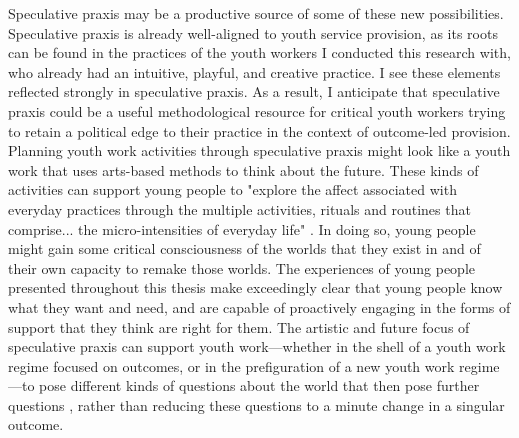 Speculative praxis may be a productive source of some of these new possibilities. Speculative praxis is already well-aligned to youth service provision, as its roots can be found in the practices of the youth workers I conducted this research with, who already had an intuitive, playful, and creative practice. I see these elements reflected strongly in speculative praxis. As a result, I anticipate that speculative praxis could be a useful methodological resource for critical youth workers trying to retain a political edge to their practice in the context of outcome-led provision. Planning youth work activities through speculative praxis might look like a youth work that uses arts-based methods to think about the future. These kinds of activities can support young people to "explore the affect associated with everyday practices through the multiple activities, rituals and routines that comprise... the micro-intensities of everyday life" \citep[p. 528]{coleman_sensory_2017}. In doing so, young people might gain some critical consciousness of the worlds that they exist in and of their own capacity to remake those worlds. The experiences of young people presented throughout this thesis make exceedingly clear that young people know what they want and need, and are capable of proactively engaging in the forms of support that they think are right for them. The artistic and future focus of speculative praxis can support youth work—whether in the shell of a youth work regime focused on outcomes, or in the prefiguration of a new youth work regime—to pose different kinds of questions about the world that then pose further questions \citep[p. 55]{coleman_glitterworlds_2020}, rather than reducing these questions to a minute change in a singular outcome. 

